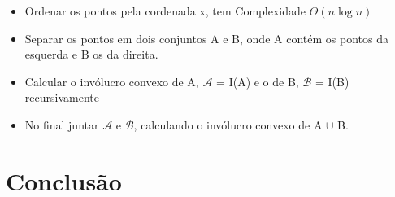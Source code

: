 \documentclass[11pt]{article}
\begin{document}
\begin{itemize}
    \item Ordenar os pontos pela cordenada x, tem Complexidade $\Theta(n\log{}n)$
    \item Separar os pontos em dois conjuntos A e B, onde A contém os pontos da esquerda e B os da direita.
    \item Calcular o invólucro convexo de A, $\mathcal{A}$ = I(A) e o de B, $\mathcal{B}$ = I(B) recursivamente
    \item No final juntar $\mathcal{A}$ e $\mathcal{B}$, calculando o invólucro convexo de A $\cup$ B.
\end{itemize}

\section{Conclusão}

%
%
%
\end{document}
